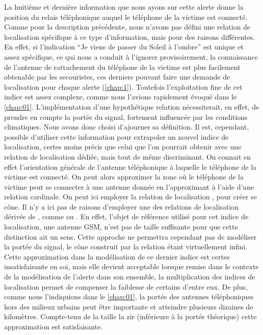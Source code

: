 La huitième et dernière information que nous ayons sur cette alerte
donne la position du relais téléphonique auquel le téléphone de la
victime est connecté. Comme pour la description précédente, nous
n'avons pas défini une relation de localisation spécifique à ce type
d'information, mais pour des raisons différentes. En effet, si
l’indication \enquote{Je viens de passer du Soleil à l'ombre} est
unique et assez spécifique, ce qui nous a conduit à l'ignorer
provisoirement, la connaissance de l'antenne de rattachement du
téléphone de la victime est plus facilement obtenable par les
secouristes, ces derniers pouvant faire une demande de localisation
pour chaque alerte (\autoref{chap:1}). Toutefois l'exploitation fine
de cet indice est assez complexe, comme nous l'avions rapidement
évoqué dans le \autoref{chap:01}. L'implémentation d'une hypothétique
relation  nécessiterait, en effet, de
prendre en compte la portée du signal, fortement influencée par les
conditions climatiques. Nous avons donc choisi d'ajourner sa
définition. Il est, cependant, possible d'utiliser cette information
pour extrapoler un nouvel indice de localisation, certes moins précis
que celui que l'on pourrait obtenir avec une relation de localisation
dédiée, mais tout de même discriminant. On connait en effet
l'orientation générale de l'antenne téléphonique à laquelle le
téléphone de la victime est connecté. On peut alors approximer la zone
où le téléphone de la victime peut se connecter à une antenne donnée
en l'approximant à l'aide d'une relation cardinale. On peut ici
employer la relation de localisation , pour
créer se cône. Il n'y a ici pas de raisons d'employer une des
relations de localisation dérivée de , comme
 ou
. En effet, l'objet de référence
utilisé pour cet indice de localisation, une antenne GSM, n'est pas de
taille suffisante pour que cette distinction ait un sens. Cette
approche ne permettra cependant pas de modéliser la portée du signal,
le cône construit par la relation  étant
virtuellement infini. Cette approximation dans la modélisation de ce
dernier indice est certes insatisfaisante en soi, mais elle devient
acceptable lorsque remise dans le contexte de la modélisation de
l'alerte dans son ensemble, la multiplication des indices de
localisation permet de compenser la faiblesse de certains d'entre
eux.
%
De plus, comme nous l'indiquions dans le \autoref{chap:01}, la
portée des antennes téléphoniques hors des milieux urbains peut être
importante et atteindre plusieurs dizaines de kilomètres. Compte-tenu
de la taille la \ac{zir} (inférieure à la portée théorique) cette
approximation est satisfaisante.


